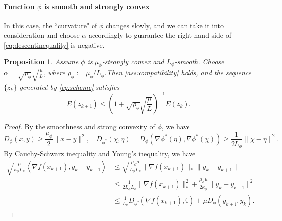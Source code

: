 \documentclass{article}
\newcommand{\LC}[1]{\textcolor{red}{#1}}
\newcommand{\dual}[1]{\left\langle {#1} \right\rangle}
\theoremstyle{plain}
\newtheorem{proposition}[theorem]{Proposition}
\theoremstyle{definition}
\theoremstyle{remark}
\newtheorem{example}[theorem]{Example}
\begin{document}
\paragraph{Function $\phi$ is smooth and strongly convex} In this case, the ``curvature" of $\phi$ changes slowly, and we can take it into consideration and choose $\alpha$ accordingly to guarantee the right-hand side of \eqref{eq:descentinequality} is negative.
\begin{proposition}
    Assume $\phi$ is $\mu_\phi$-strongly convex and $L_\phi$-smooth. Choose $\alpha=\sqrt{\rho_\phi}\sqrt{\frac{\mu}{L}}$, where $\rho_\phi:=\mu_\phi/L_\phi$.Then \eqref{ass:compatibility} holds, and the sequence $\{z_k\}$ generated by \eqref{eq:scheme} satisfies
$$
E(z_{k+1}) \leq \left(1 + \sqrt{\rho_\phi}\sqrt{\frac{\mu}{L}}\right)^{-1} E(z_k).
$$
\end{proposition}
\begin{proof}
By the smoothness and strong convexity of $\phi$, we have
$$D_{\phi}(x,y)\geq \frac{\mu_\phi}{2} \|x-y\|^2,\quad D_{\phi^*}(\chi,\eta)=D_\phi(\nabla \phi^*(\eta),\nabla \phi^*(\chi))\geq \frac{1}{2L_\phi} \|\chi-\eta\|^2.$$
By Cauchy-Schwarz inequality and Young's inequality, we have
$$\begin{aligned}
    \sqrt{\frac{\mu}{\kappa_\phi L_k}}\dual{\nabla f(x_{k+1}),y_{k}-y_{k+1}}{}&\leq \sqrt{\frac{\mu_\phi \mu }{L_\phi L_k}} \|\nabla f(x_{k+1})\|_*\|y_k-y_{k+1}\|\\
    {}&\leq \frac{1}{2L_\phi L_k}\|\nabla f(x_{k+1})\|_*^2+\frac{\mu_\phi \mu}{2\kappa_\phi}\|y_k-y_{k+1}\|^2\\
    {}&\leq \frac{1}{L_k} D_{\phi^*}(\nabla f(x_{k+1}),0)+\mu D_\phi(y_{k+1},y_k).
\end{aligned}$$
\end{proof}

\end{document}
